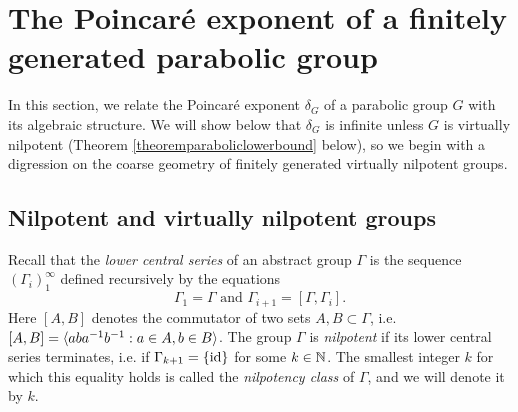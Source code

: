%
%





\section{The Poincar\'e exponent of a finitely generated parabolic group}
\label{subsectionparabolicexponent}
In this section, we relate the Poincar\'e exponent $\delta_G$ of a parabolic group $G$ with its algebraic structure. We will show below that $\delta_G$ is infinite unless $G$ is virtually nilpotent (Theorem \ref{theoremparaboliclowerbound} below), so we begin with a digression on the coarse geometry of finitely generated virtually nilpotent groups.

\subsection{Nilpotent and virtually nilpotent groups}
\label{subsubsectionnilpotent}
Recall that the \emph{lower central series} of an abstract group $\Gamma$ is the sequence $(\Gamma_i)_1^\infty$ defined recursively by the equations
\[
\Gamma_1 = \Gamma \text{ and } \Gamma_{i + 1} = [\Gamma,\Gamma_i].
\]
Here $[A,B]$ denotes the commutator of two sets $A,B\subset \Gamma$, i.e. $[A,B] = \langle aba^{-1}b^{-1} : a\in A, b\in B\rangle$. The group $\Gamma$ is \emph{nilpotent} if its lower central series terminates, i.e. if $\Gamma_{k + 1} = \{\mathrm{id}\}$ for some $k\in\N$. The smallest integer $k$ for which this equality holds is called the \emph{nilpotency class} of $\Gamma$, and we will denote it by $k$.

